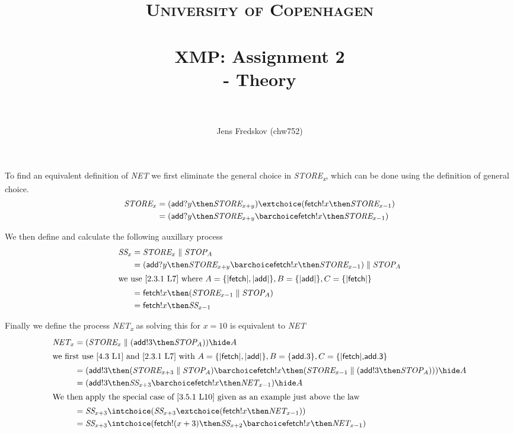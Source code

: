 \documentclass[a4paper, 11pt]{article}
\title{ 
\normalfont \normalsize 
\textsc{University of Copenhagen} \\ [25pt]
\horrule{0.5pt} \\[0.4cm]
\huge XMP: Assignment 2 \\ \Large - Theory \\
\horrule{2pt} \\[0.5cm]
}
\author{Jens Fredskov (chw752)}
\def\add{\textsf{add}}
\def\fetch{\textsf{fetch}}
\def\Ss{\textit{SS}}
\def\Stop{\textit{STOP}_A}
\begin{document}
\maketitle
\pagebreak

\section{} %

To find an equivalent definition of \textit{NET} we first eliminate the general choice in \textit{STORE\textsubscript{x}}, which can be done using the definition of general choice.
\begin{align*}
    \textit{STORE}_x
    &= ( \add ? y \then \textit{STORE}_{x+y}) \extchoice (\fetch ! x \then \textit{STORE}_{x-1} ) \\
    &= ( \add ? y \then \textit{STORE}_{x+y} \barchoice \fetch ! x \then \textit{STORE}_{x-1} )
\end{align*}

We then define and calculate the following auxillary process
\begin{align*}
    \Ss_x
    &= \textit{STORE}_x \parallel \Stop \\
    &= ( \add ? y \then \textit{STORE}_{x+y} \barchoice \fetch ! x \then \textit{STORE}_{x-1} ) \parallel \Stop \\
    \intertext{we use [2.3.1 L7] where $A=\{\textsf{|fetch|}, \textsf{|add|}\}, B=\{\textsf{|add|}\}, C=\{\textsf{|fetch|}\}$}
    &= \fetch ! x \then (\textit{STORE}_{x-1} \parallel \Stop) \\
    &= \fetch ! x \then \Ss_{x-1}
\end{align*}

Finally we define the process \textit{NET\textsubscript{x}} as solving this for $x = 10$ is equivalent to \textit{NET}
\begin{align*}
    \textit{NET}_x
    &= (\textit{STORE}_x \parallel ( \add ! 3 \then \Stop )) \hide A \\
    \intertext{we first use [4.3 L1] and [2.3.1 L7] with $A=\{\textsf{|fetch|}, \textsf{|add|}\}, B=\{\textsf{add}.3\}, C=\{\textsf{|fetch|,\add.3}\}$}
    &= (\add ! 3 \then (\textit{STORE}_{x+3} \parallel \Stop) \barchoice \fetch ! x \then (\textit{STORE}_{x-1} \parallel (\add ! 3 \then \Stop))) \hide A \\
    &= (\add ! 3 \then \Ss_{x+3} \barchoice \fetch ! x \then \textit{NET}_{x-1}) \hide A \\
    \intertext{We then apply the special case of [3.5.1 L10] given as an example just above the law}
    &= \Ss_{x+3} \intchoice (\Ss_{x+3} \extchoice (\fetch ! x \then \textit{NET}_{x-1})) \\
    &= \Ss_{x+3} \intchoice (\fetch ! (x+3) \then \Ss_{x+2} \barchoice \fetch ! x \then \textit{NET}_{x-1})
\end{align*}
\end{document}
